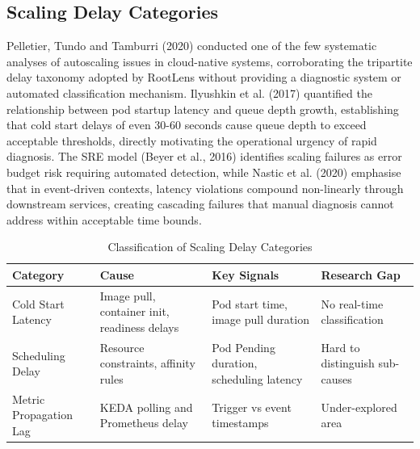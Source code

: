 \subsection{Scaling Delay Categories}
Pelletier, Tundo and Tamburri (2020) conducted one of the few systematic analyses of autoscaling issues in cloud-native systems, corroborating the tripartite delay taxonomy adopted by RootLens without providing a diagnostic system or automated classification mechanism. Ilyushkin et al. (2017) quantified the relationship between pod startup latency and queue depth growth, establishing that cold start delays of even 30-60 seconds cause queue depth to exceed acceptable thresholds, directly motivating the operational urgency of rapid diagnosis. The SRE model (Beyer et al., 2016) identifies scaling failures as error budget risk requiring automated detection, while Nastic et al. (2020) emphasise that in event-driven contexts, latency violations compound non-linearly through downstream services, creating cascading failures that manual diagnosis cannot address within acceptable time bounds.

\begin{table}[H]
\centering
\begin{tabularx}{\textwidth}{|X|X|X|X|}
\hline
\textbf{Category} & \textbf{Cause} & \textbf{Key Signals} & \textbf{Research Gap} \\ \hline

Cold Start Latency & Image pull, container init, readiness delays & Pod start time, image pull duration & No real-time classification \\ \hline

Scheduling Delay & Resource constraints, affinity rules & Pod Pending duration, scheduling latency & Hard to distinguish sub-causes \\ \hline

Metric Propagation Lag & KEDA polling and Prometheus delay & Trigger vs event timestamps & Under-explored area \\ \hline

\end{tabularx}
\caption{Classification of Scaling Delay Categories}
\end{table}

